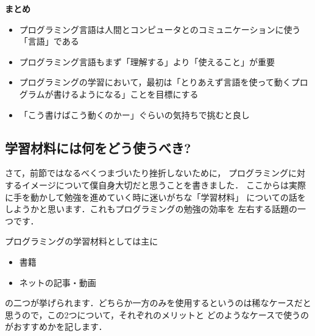 \documentclass[autodetect-engine,dvi=dvipdfmx,ja=standard,a4j,12pt]{bxjsarticle}
\begin{document}
\begin{center}
    \Large{\textbf{まとめ}}
\end{center}
\begin{itemize}
    \item プログラミング言語は人間とコンピュータとのコミュニケーションに使う「言語」である
    \item プログラミング言語もまず「理解する」より「使えること」が重要
    \item プログラミングの学習において，最初は「とりあえず言語を使って動くプログラムが書けるようになる」ことを目標にする
    \item 「こう書けばこう動くのかー」ぐらいの気持ちで挑むと良し
\end{itemize}

\subsection{学習材料には何をどう使うべき?}
さて，前節ではなるべくつまづいたり挫折しないために，
プログラミングに対するイメージについて僕自身大切だと思うことを書きました．
ここからは実際に手を動かして勉強を進めていく時に迷いがちな「学習材料」
についての話をしようかと思います．これもプログラミングの勉強の効率を
左右する話題の一つです．

プログラミングの学習材料としては主に
\begin{itemize}
    \item 書籍
    \item ネットの記事・動画
\end{itemize}
の二つが挙げられます．どちらか一方のみを使用するというのは稀なケースだと
思うので，この2つについて，それぞれのメリットと
どのようなケースで使うのがおすすめかを記します．\\
\end{document}
